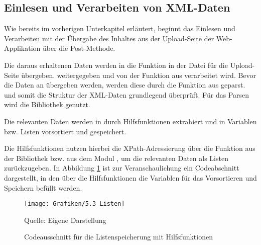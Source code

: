 \subsection{Einlesen und Verarbeiten von XML-Daten}
\label{subsec:einlesen-und-verarbeiten-von-xml-daten}

Wie bereits im vorherigen Unterkapitel erläutert, beginnt das Einlesen und Verarbeiten mit der Übergabe des Inhaltes aus der
Upload-Seite der Web-Applikation über die Post-Methode.

Die daraus erhaltenen Daten werden in die Funktion  in der Datei  für die Upload-Seite übergeben.
weitergegeben und von der Funktion  aus  verarbeitet wird.
Bevor die Daten an  übergeben werden, werden diese durch die Funktion  aus
 geparst.
und somit die Struktur der XML-Daten grundlegend überprüft.
Für das Parsen wird die Bibliothek  genutzt.

Die relevanten Daten werden in  durch Hilfsfunktionen extrahiert und in Variablen bzw. Listen
vorsortiert und gespeichert.

Die Hilfsfunktionen nutzen hierbei die XPath-Adressierung über die Funktion  aus der Bibliothek 
bzw. aus dem Modul , um die relevanten Daten als Listen zurückzugeben.
In Abbildung \ref{fig: Codeausschnitt für die Listenspeicherung mit Hilfsfunktionen} ist zur Veranschaulichung ein Codeabschnitt dargestellt, in den über die Hilfsfunktionen die Variablen
für das Vorsortieren und Speichern befüllt werden.

\begin{figure}[H]
    \centering
    \texttt{[image: Grafiken/5.3 Listen]}
    \caption{Codeausschnitt für die Listenspeicherung mit Hilfsfunktionen}
    \label{fig: Codeausschnitt für die Listenspeicherung mit Hilfsfunktionen}
    {Quelle: Eigene Darstellung}
\end{figure}

